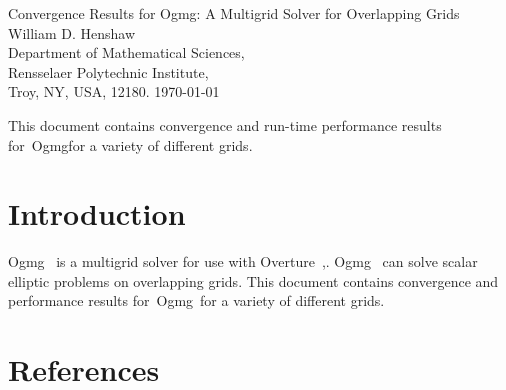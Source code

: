 \documentclass{article}
\begin{document}

\newcommand{\ogen}{\homeHenshaw/res/ogen}
\newcommand{\figures}{\homeHenshaw/Overture/docFigures}
\newcommand{\automg}{\homeHenshaw/papers/automg}
\newcommand{\ogmgDir}{\homeHenshaw/Overture/ogmg/doc}
\newcommand{\ogmgDocDir}{\homeHenshaw/Overture/ogmg/doc}

\newcommand{\Ogen}{{Ogen}}
\newcommand{\Overture}{{Overture}}
\newcommand{\Ogmg}{{Ogmg}}

\newcommand{\tablefontsize}{\footnotesize}
\newcommand{\clipfig}{}

\newcommand{\bogus}[1]{}




\baselineskip
\begin{flushleft}
{\Large
  Convergence Results for Ogmg: A Multigrid Solver for Overlapping Grids\\
}
\vspace{2\baselineskip}
William D. Henshaw  \\
Department of Mathematical Sciences, \\
Rensselaer Polytechnic Institute, \\
Troy, NY, USA, 12180.
\vspace{\baselineskip}
\today\\
\vspace{\baselineskip}


\vspace{4\baselineskip}

This document contains convergence and run-time performance results for~\Ogmg for a variety
of different grids.

\end{flushleft}

\clearpage
\tableofcontents



\clearpage
\section{Introduction}

\Ogmg~ is a multigrid solver for use with \Overture~\cite{overset96},\cite{OGES}.
\Ogmg~ can solve scalar elliptic problems
on overlapping grids. This document contains convergence and performance results for~\Ogmg\ for a variety
of different grids.







\clearpage
\section{References}




% 



\printindex
\end{document}
